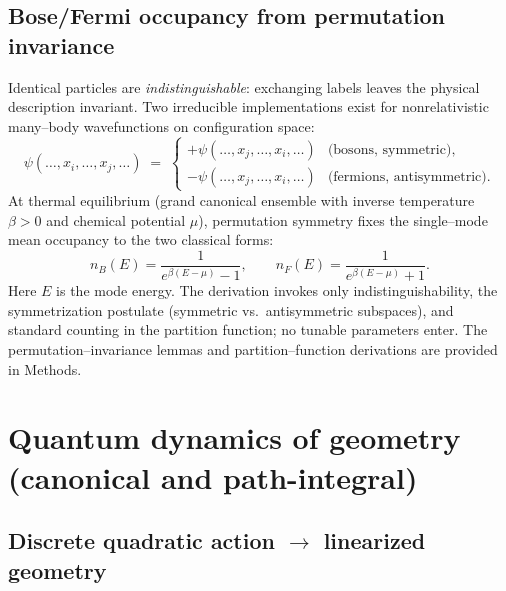 \documentclass[11pt]{article}
\begin{document}
\subsection{Bose/Fermi occupancy from permutation invariance}
\label{subsec:bose-fermi}

Identical particles are \emph{indistinguishable}: exchanging labels leaves the physical description invariant. Two irreducible implementations exist for nonrelativistic many–body wavefunctions on configuration space:
\[
\psi(\ldots,x_i,\ldots,x_j,\ldots)\;=\;\begin{cases}
+\psi(\ldots,x_j,\ldots,x_i,\ldots) & \text{(bosons, symmetric)},\\[2pt]
-\psi(\ldots,x_j,\ldots,x_i,\ldots) & \text{(fermions, antisymmetric)}.
\end{cases}
\]
At thermal equilibrium (grand canonical ensemble with inverse temperature $\beta>0$ and chemical potential $\mu$), permutation symmetry fixes the single–mode mean occupancy to the two classical forms:
\[
\boxed{n_B(E) = \frac{1}{e^{\beta(E-\mu)}-1}, \qquad
n_F(E) = \frac{1}{e^{\beta(E-\mu)}+1}}.
\]
Here $E$ is the mode energy. The derivation invokes only indistinguishability, the symmetrization postulate (symmetric vs.\ antisymmetric subspaces), and standard counting in the partition function; no tunable parameters enter. The permutation–invariance lemmas and partition–function derivations are provided in Methods.

\section{Quantum dynamics of geometry (canonical and path-integral)}
\label{sec:qg-module}

\subsection*{Discrete quadratic action $\to$ linearized geometry}
\end{document}
